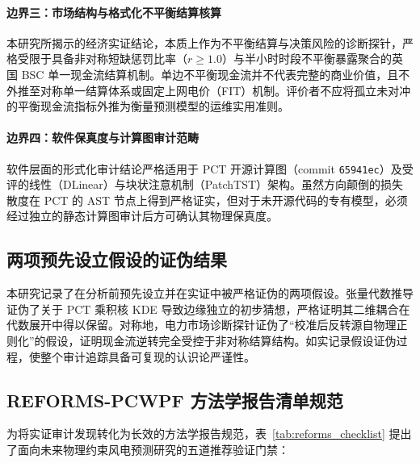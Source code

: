 \paragraph{边界三：市场结构与格式化不平衡结算核算}
本研究所揭示的经济实证结论，本质上作为不平衡结算与决策风险的诊断探针，严格受限于具备非对称短缺惩罚比率（$r \ge 1.0$）与半小时时段不平衡暴露聚合的英国 BSC 单一现金流结算机制。单边不平衡现金流并不代表完整的商业价值，且不外推至对称单一结算体系或固定上网电价（FIT）机制。评价者不应将孤立未对冲的平衡现金流指标外推为衡量预测模型的运维实用准则。

\paragraph{边界四：软件保真度与计算图审计范畴}
软件层面的形式化审计结论严格适用于 PCT 开源计算图（commit \texttt{65941ec}）及受评的线性（DLinear）与块状注意机制（PatchTST）架构。虽然方向颠倒的损失散度在 PCT 的 AST 节点上得到严格证实，但对于未开源代码的专有模型，必须经过独立的静态计算图审计后方可确认其物理保真度。

\subsection{两项预先设立假设的证伪结果}
本研究记录了在分析前预先设立并在实证中被严格证伪的两项假设。张量代数推导证伪了关于 PCT 乘积核 KDE 导致边缘独立的初步猜想，严格证明其二维耦合在代数展开中得以保留。对称地，电力市场诊断探针证伪了“校准后反转源自物理正则化”的假设，证明现金流逆转完全受控于非对称结算结构。如实记录假设证伪过程，使整个审计追踪具备可复现的认识论严谨性。

\subsection{REFORMS-PCWPF 方法学报告清单规范}
\label{sec:reforms_pcwpf}
为将实证审计发现转化为长效的方法学报告规范，表~\ref{tab:reforms_checklist} 提出了面向未来物理约束风电预测研究的五道推荐验证门禁：



